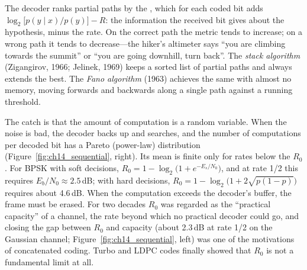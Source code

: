 
The decoder ranks partial paths by the , which for each coded bit adds
$\log_2\big[p(y\mid x)/p(y)\big]-R$: the information the received bit gives about the hypothesis, minus
the rate. On the correct path the metric tends to increase; on a wrong path it tends to decrease---the
hiker's altimeter says ``you are climbing towards the summit'' or ``you are going downhill, turn back''.
The \emph{stack algorithm} (Zigangirov, 1966; Jelinek, 1969) keeps a sorted list of partial paths and
always extends the best. The \emph{Fano algorithm} (1963) achieves the same with almost no memory, moving
forwards and backwards along a single path against a running threshold.


The catch is that the amount of computation is a random variable. When the noise is bad, the decoder
backs up and searches, and the number of computations per decoded bit has a Pareto (power-law)
distribution (Figure~\ref{fig:ch14_sequential}, right). Its mean is finite only for rates below the
 $R_0$. For BPSK with soft decisions, $R_0=1-\log_2\!\big(1+e^{-E_s/N_0}\big)$,
and at rate 1/2 this requires $E_b/N_0\approx2.5$\,dB; with hard decisions,
$R_0=1-\log_2\big(1+2\sqrt{p(1-p)}\big)$ requires about 4.6\,dB. When the computation exceeds the decoder's
buffer, the frame must be erased. For two decades $R_0$ was regarded as the ``practical capacity'' of a
channel, the rate beyond which no practical decoder could go, and closing the gap between $R_0$ and
capacity (about 2.3\,dB at rate 1/2 on the Gaussian channel; Figure~\ref{fig:ch14_sequential}, left) was
one of the motivations of concatenated coding. Turbo and LDPC codes finally showed that $R_0$ is not a
fundamental limit at all.


